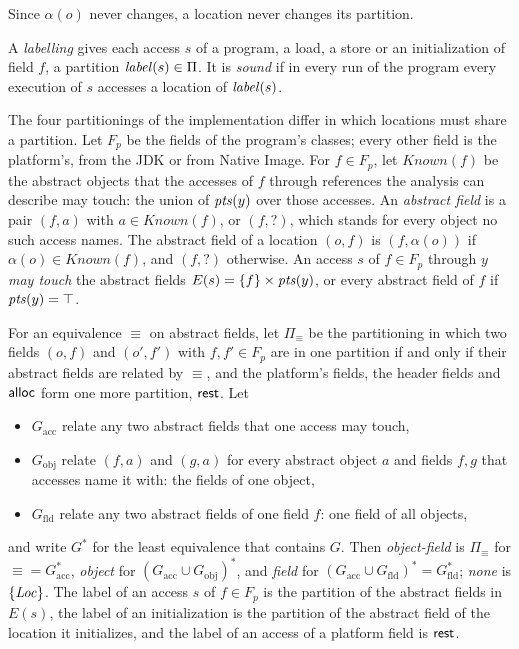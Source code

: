 Since $\alpha(o)$ never changes, a location never changes its partition.

\begin{definition}[Labelling]\label{def:ee-labelling}
A \emph{labelling} gives each access $s$ of a program, a load, a store or an
initialization of field $f$, a partition $\mathit{label}(s) \in \Pi$. It is \emph{sound}
if in every run of the program every execution of $s$ accesses a location of
$\mathit{label}(s)$.
\end{definition}

The four partitionings of the implementation differ in which locations must
share a partition. Let $F_p$ be the fields of the program's classes; every other
field is the platform's, from the JDK or from Native Image. For $f \in F_p$, let
$\mathit{Known}(f)$ be the abstract objects that the accesses of $f$ through
references the analysis can describe may touch: the union of $\mathit{pts}(y)$ over
those accesses. An \emph{abstract field} is a pair $(f, a)$ with
$a \in \mathit{Known}(f)$, or $(f, ?)$, which stands for every object no such
access names. The abstract field of a location $(o, f)$ is $(f, \alpha(o))$ if
$\alpha(o) \in \mathit{Known}(f)$, and $(f, ?)$ otherwise. An access $s$ of
$f \in F_p$ through $y$ \emph{may touch} the abstract fields
$E(s) = \{f\} \times \mathit{pts}(y)$, or every abstract field of $f$ if
$\mathit{pts}(y) = \top$.

\begin{definition}\label{def:ee-four}
For an equivalence $\equiv$ on abstract fields, let $\Pi_\equiv$ be the
partitioning in which two fields $(o, f)$ and $(o', f')$ with $f, f' \in F_p$
are in one partition if and only if their abstract fields are related by
$\equiv$, and the platform's fields, the header fields and $\mathsf{alloc}$ form one
more partition, $\mathsf{rest}$. Let
\begin{itemize}
\item $G_{\mathrm{acc}}$ relate any two abstract fields that one access may touch,
\item $G_{\mathrm{obj}}$ relate $(f, a)$ and $(g, a)$ for every abstract object
  $a$ and fields $f, g$ that accesses name it with: the fields of one object,
\item $G_{\mathrm{fld}}$ relate any two abstract fields of one field $f$: one
  field of all objects,
\end{itemize}
and write $G^{\ast}$ for the least equivalence that contains $G$. Then
\emph{object-field} is $\Pi_\equiv$ for ${\equiv} = G_{\mathrm{acc}}^{\ast}$,
\emph{object} for $(G_{\mathrm{acc}} \cup G_{\mathrm{obj}})^{\ast}$, and \emph{field}
for $(G_{\mathrm{acc}} \cup G_{\mathrm{fld}})^{\ast} = G_{\mathrm{fld}}^{\ast}$; \emph{none}
is $\{\mathit{Loc}\}$. The label of an access $s$ of $f \in F_p$ is the partition of the
abstract fields in $E(s)$, the label of an initialization is the partition of
the abstract field of the location it initializes, and the label of an access
of a platform field is $\mathsf{rest}$.
\end{definition}

